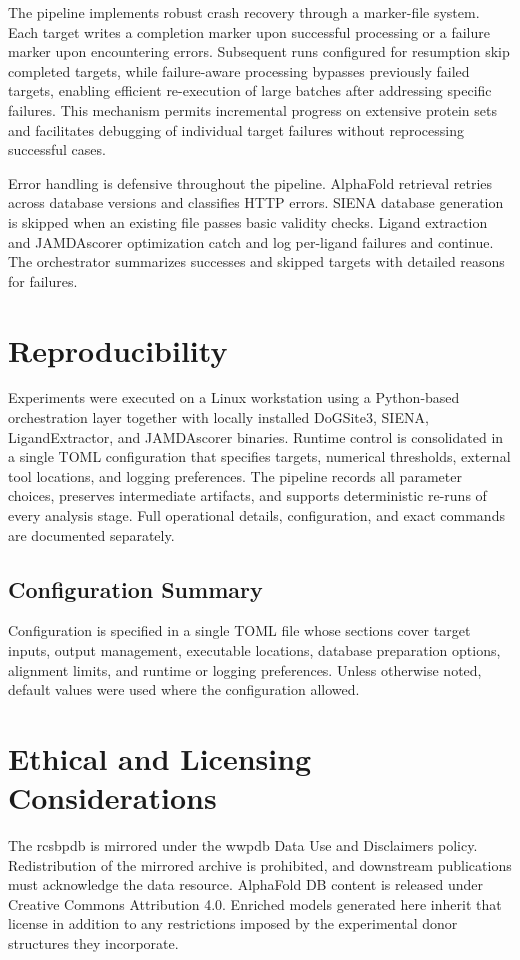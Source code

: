 The pipeline implements robust crash recovery through a marker-file system. Each target writes a completion marker upon successful processing or a failure marker upon encountering errors. Subsequent runs configured for resumption skip completed targets, while failure-aware processing bypasses previously failed targets, enabling efficient re-execution of large batches after addressing specific failures. This mechanism permits incremental progress on extensive protein sets and facilitates debugging of individual target failures without reprocessing successful cases.

Error handling is defensive throughout the pipeline. AlphaFold retrieval retries across database versions and classifies HTTP errors. SIENA database generation is skipped when an existing file passes basic validity checks. Ligand extraction and JAMDAscorer optimization catch and log per-ligand failures and continue. The orchestrator summarizes successes and skipped targets with detailed reasons for failures.

\section{Reproducibility}
Experiments were executed on a Linux workstation using a Python-based orchestration layer together with locally installed DoGSite3, SIENA, LigandExtractor, and JAMDAscorer binaries. Runtime control is consolidated in a single TOML configuration that specifies targets, numerical thresholds, external tool locations, and logging preferences. The pipeline records all parameter choices, preserves intermediate artifacts, and supports deterministic re-runs of every analysis stage. Full operational details, configuration, and exact commands are documented separately.

\subsection{Configuration Summary}\label{subsec:configuration}
Configuration is specified in a single TOML file whose sections cover target inputs, output management, executable locations, database preparation options, alignment limits, and runtime or logging preferences. Unless otherwise noted, default values were used where the configuration allowed.

\section{Ethical and Licensing Considerations}
The \gls{rcsbpdb} \cite{burleyRCSBProteinData2019} is mirrored under the \gls{wwpdb} Data Use and Disclaimers policy. Redistribution of the mirrored archive is prohibited, and downstream publications must acknowledge the data resource. AlphaFold DB content is released under Creative Commons Attribution 4.0. Enriched models generated here inherit that license in addition to any restrictions imposed by the experimental donor structures they incorporate.

